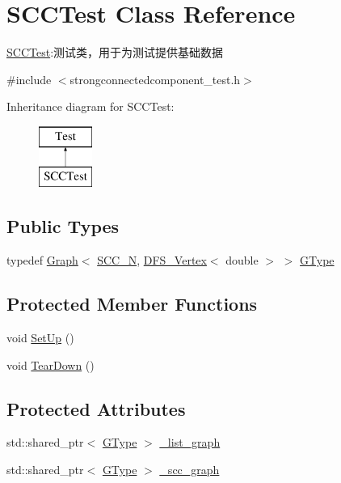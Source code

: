 \hypertarget{class_s_c_c_test}{}\section{S\+C\+C\+Test Class Reference}
\label{class_s_c_c_test}


\hyperlink{class_s_c_c_test}{S\+C\+C\+Test}\+:测试类，用于为测试提供基础数据  




{\ttfamily \#include $<$strongconnectedcomponent\+\_\+test.\+h$>$}

Inheritance diagram for S\+C\+C\+Test\+:\begin{figure}[H]
\begin{center}
\leavevmode
\includegraphics[height=2.000000cm]{class_s_c_c_test}
\end{center}
\end{figure}
\subsection*{Public Types}
\begin{DoxyCompactItemize}
\item 
typedef \hyperlink{struct_introduction_to_algorithm_1_1_graph_algorithm_1_1_graph}{Graph}$<$ \hyperlink{strongconnectedcomponent__test_8h_a0ddf916c5c77afc2157c81a49bc53a52}{S\+C\+C\+\_\+\+N}, \hyperlink{struct_introduction_to_algorithm_1_1_graph_algorithm_1_1_d_f_s___vertex}{D\+F\+S\+\_\+\+Vertex}$<$ double $>$ $>$ \hyperlink{class_s_c_c_test_abb59a4d30b8d2bb5c08e09e902745824}{G\+Type}
\end{DoxyCompactItemize}
\subsection*{Protected Member Functions}
\begin{DoxyCompactItemize}
\item 
void \hyperlink{class_s_c_c_test_a840b86482e67f9b7e483645eea64d950}{Set\+Up} ()
\item 
void \hyperlink{class_s_c_c_test_a9de4301f4841fd61853a61399f6f9bfc}{Tear\+Down} ()
\end{DoxyCompactItemize}
\subsection*{Protected Attributes}
\begin{DoxyCompactItemize}
\item 
std\+::shared\+\_\+ptr$<$ \hyperlink{class_s_c_c_test_abb59a4d30b8d2bb5c08e09e902745824}{G\+Type} $>$ \hyperlink{class_s_c_c_test_a45ded9e0483b0f9c25bbbe8b058c8b77}{\+\_\+list\+\_\+graph}
\item 
std\+::shared\+\_\+ptr$<$ \hyperlink{class_s_c_c_test_abb59a4d30b8d2bb5c08e09e902745824}{G\+Type} $>$ \hyperlink{class_s_c_c_test_a4752a3091b185c9f5e5beddb842211e5}{\+\_\+scc\+\_\+graph}
\end{DoxyCompactItemize}


